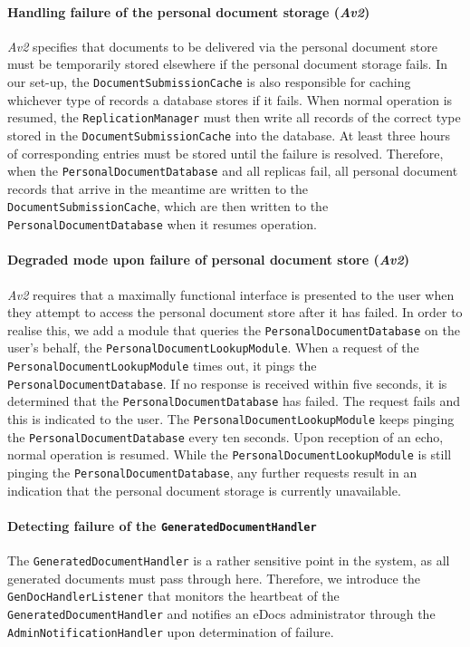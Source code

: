 \documentclass[a4paper,10pt]{article}
\begin{document}
\paragraph{Handling failure of the personal document storage (\emph{Av2})}
\emph{Av2} specifies that documents to be delivered via the personal document store must be temporarily stored elsewhere if the personal document storage fails. In our set-up, the \texttt{DocumentSubmissionCache} is also responsible for caching whichever type of records a database stores if it fails. When normal operation is resumed, the \texttt{ReplicationManager} must then write all records of the correct type stored in the \texttt{DocumentSubmissionCache} into the database. At least three hours of corresponding entries must be stored until the failure is resolved. Therefore, when the \texttt{PersonalDocumentDatabase} and all replicas fail, all personal document records that arrive in the meantime are written to the \texttt{DocumentSubmissionCache}, which are then written to the \texttt{PersonalDocumentDatabase} when it resumes operation.

\paragraph{Degraded mode upon failure of personal document store (\emph{Av2})}
\emph{Av2} requires that a maximally functional interface is presented to the user when they attempt to access the personal document store after it has failed. In order to realise this, we add a module that queries the \texttt{PersonalDocumentDatabase} on the user's behalf, the \texttt{PersonalDocumentLookupModule}. When a request of the \texttt{PersonalDocumentLookupModule} times out, it pings the \texttt{PersonalDocumentDatabase}. If no response is received within five seconds, it is determined that the \texttt{PersonalDocumentDatabase} has failed. The request fails and this is indicated to the user. The \texttt{PersonalDocumentLookupModule} keeps pinging the \texttt{PersonalDocumentDatabase} every ten seconds. Upon reception of an echo, normal operation is resumed. While the \texttt{PersonalDocumentLookupModule} is still pinging the \texttt{PersonalDocumentDatabase}, any further requests result in an indication that the personal document storage is currently unavailable.

\paragraph{Detecting failure of the \texttt{GeneratedDocumentHandler}}
The \texttt{GeneratedDocumentHandler} is a rather sensitive point in the system, as all generated documents must pass through here. Therefore, we introduce the \texttt{GenDocHandlerListener} that monitors the heartbeat of the \texttt{GeneratedDocumentHandler} and notifies an eDocs administrator through the \texttt{AdminNotificationHandler} upon determination of failure.
\end{document}
